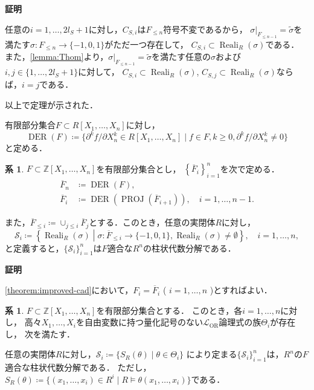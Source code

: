 \documentclass[uplatex, dvipdfmx]{jsarticle}
\makeatletter
\numberwithin{equation}{section}
\renewenvironment{proof}[1][\proofname]{\par
  \pushQED{\qed}%
  \normalfont \topsep6\p@\@plus6\p@\relax
  \trivlist
  \item\relax
  {\bfseries
  #1\@addpunct{.}}\hspace\labelsep\ignorespaces
}{
  \popQED\endtrivlist\@endpefalse
}
\newcommand{\Z}{\mathbb{Z}}
\newcommand{\map}[3]{{#1}\colon{#2}\rightarrow{#3}}
\DeclareMathOperator{\PROJ}{PROJ}
\DeclareMathOperator{\Reali}{Reali}
\DeclareMathOperator{\DER}{DER}
\theoremstyle{definition}
\newtheorem{corollary}[definition]{系}
\renewcommand{\proofname}{\textbf{証明}}
\makeatother
\begin{document}
\begin{proof}
     任意の$i=1, \dots, 2l_S+1$に対し，$C_{S,i}$は$F_{\leq n}$符号不変であるから，
     $\sigma|_{F_{\leq n-1}} = \widetilde{\sigma}$を満たす$\map{\sigma}{F_{\leq n}}{\{-1,0,1\}}$がただ一つ存在して，
     $C_{S,i} \subset \Reali_R(\sigma)$である．
     また，\cref{lemma:Thom}より，$\sigma|_{F_{\leq n-1}} = \widetilde{\sigma}$を満たす任意の$\sigma$および
     $i,j \in \{1, \dots, 2l_S + 1\}$に対して，
     $C_{S,i} \subset \Reali_R(\sigma)$, $C_{S,j} \subset \Reali_R(\sigma)$ならば，$i=j$である．

     以上で定理が示された．
\end{proof}

有限部分集合$F \subset R[X_1, \dots, X_n]$に対し，
\begin{equation}
     \DER(F) \coloneqq \{\partial^k f / \partial X_n^k \in R[X_1, \dots, X_n] \mid f \in F, k \geq 0, \partial^k f / \partial X_n^k \neq 0\}
\end{equation}
と定める．

\begin{corollary} \label{corollary:improved-cad}
     $F \subset \Z[X_1, \dots, X_n]$を有限部分集合とし，
     $\left\{\overline{F}_i\right\}_{i=1}^n$を次で定める．
     \begin{align}
          \overline{F}_n & \coloneqq \DER(F),\\
          \overline{F}_i & \coloneqq \DER\left(\PROJ\left(\overline{F}_{i+1}\right)\right), \quad i=1, \dots, n-1.
     \end{align}

     また，$\overline{F}_{\leq i}\coloneqq \cup_{j \leq i} \overline{F}_j$とする．このとき，任意の実閉体$R$に対し，
     \begin{equation}
          \mathcal{S}_i \coloneqq \left\{\Reali_R(\sigma) \middle| \map{\sigma}{\overline{F}_{\leq i}}{\{-1,0,1\}}, \Reali_R(\sigma) \neq \emptyset\right\}, \quad i=1, \dots, n ,
     \end{equation}          
     と定義すると，$\{\mathcal{S}_i\}_{i=1}^n$は$F$適合な$R^n$の柱状代数分解である．
\end{corollary}

\begin{proof}
     \cref{theorem:improved-cad}において，$F_i = \overline{F}_i$ ( $i=1, \dots, n$ )とすればよい．
\end{proof}

\begin{corollary}\label{corollary:trick-of-qecad}
     $F \subset \Z[X_1, \dots, X_n]$を有限部分集合とする．
     このとき，各$i=1, \dots, n$に対し，
     高々$X_1, \dots, X_i$を自由変数に持つ量化記号のない$\mathcal{L}_\mathrm{OR}$論理式の族$\Theta_i$が存在し，
     次を満たす．

     任意の実閉体$R$に対し，$\mathcal{S}_i \coloneqq\{S_R(\theta) \mid \theta \in \Theta_i\}$
     により定まる$\{\mathcal{S}_i\}_{i=1}^n$は，$R^n$の$F$適合な柱状代数分解である．
     ただし，$S_R(\theta) \coloneqq \{(x_1, \dots, x_i) \in R^i \mid R \models \theta(x_1, \dots, x_i)\}$である．
\end{corollary}
\end{document}
